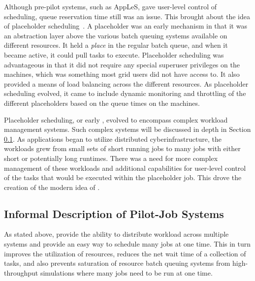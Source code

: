 \documentclass{sig-alternate}
\begin{document}
Although pre-pilot systems, such as AppLeS, gave user-level control of
scheduling, queue reservation time still was an issue. This brought
about the idea of placeholder
scheduling~\cite{Pinchak02practicalheterogeneous,
  Singh:2008:WTC:1341811.1341822}. A placeholder was an early \pilot
mechanism in that it was an abstraction layer above the various batch
queuing systems available on different resources. It held a
\textit{place} in the regular batch queue, and when it became active,
it could pull tasks to execute.  Placeholder scheduling was
advantageous in that it did not require any special superuser
privileges on the machines, which was something most grid users did
not have access to. It also provided a means of load balancing across
the different resources. As placeholder scheduling evolved, it came to
include dynamic monitoring and throttling of the different
placeholders based on the queue times on the machines.

Placeholder scheduling, or early \pilots, evolved to encompass complex
workload management systems. Such complex systems will be discussed in
depth in Section \ref{sec:pj}. As applications began to utilize
distributed cyberinfrastructure, the workloads grew from small sets of
short running jobs to many jobs with either short or potentially long
runtimes. There was a need for more complex management of these
workloads and additional capabilities for user-level control of the
tasks that would be executed within the placeholder job. This drove
the creation of the modern idea of \pilots.
 

\subsection{Informal Description of Pilot-Job Systems}
\label{sec:pj}


As stated above, \pilotjobs provide the ability to distribute workload
across multiple systems and provide an easy way to schedule many jobs
at one time. This in turn improves the utilization of resources,
reduces the net wait time of a collection of tasks, and also prevents
saturation of resource batch queuing systems from high-throughput
simulations where many jobs need to be run at one time.
\end{document}
